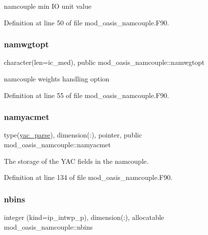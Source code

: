 namcouple min IO unit value 



Definition at line 50 of file mod\+\_\+oasis\+\_\+namcouple.\+F90.

\mbox{\label{namespacemod__oasis__namcouple_a03a63fe10e98e695e556ee190cd3accc}} 
\subsubsection{\texorpdfstring{namwgtopt}{namwgtopt}}
{\footnotesize\ttfamily character(len=ic\+\_\+med), public mod\+\_\+oasis\+\_\+namcouple\+::namwgtopt}



namcouple weights handling option 



Definition at line 55 of file mod\+\_\+oasis\+\_\+namcouple.\+F90.

\mbox{\label{namespacemod__oasis__namcouple_a5a6235eee48f0afaa42eedbf807a252e}} 
\subsubsection{\texorpdfstring{namyacmet}{namyacmet}}
{\footnotesize\ttfamily type(\hyperlink{structmod__oasis__namcouple_1_1yac__parse}{yac\+\_\+parse}), dimension(\+:), pointer, public mod\+\_\+oasis\+\_\+namcouple\+::namyacmet}



The storage of the Y\+AC fields in the namcouple. 



Definition at line 134 of file mod\+\_\+oasis\+\_\+namcouple.\+F90.

\mbox{\label{namespacemod__oasis__namcouple_a4c609c48a20205e1d2aa9938d7babc92}} 
\subsubsection{\texorpdfstring{nbins}{nbins}}
{\footnotesize\ttfamily integer (kind=ip\+\_\+intwp\+\_\+p), dimension(\+:), allocatable mod\+\_\+oasis\+\_\+namcouple\+::nbins\hspace{0.3cm}{\ttfamily [private]}}



